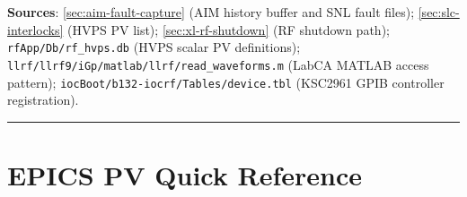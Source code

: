 \begin{keynote}
\textbf{Sources}: \cref{sec:aim-fault-capture} (AIM history buffer and SNL fault files); \cref{sec:slc-interlocks} (HVPS PV list); \cref{sec:xl-rf-shutdown} (RF shutdown path); \texttt{rfApp/\allowbreak{}Db/\allowbreak{}rf\_\allowbreak{}hvps.\allowbreak{}db} (HVPS scalar PV definitions); \texttt{llrf/\allowbreak{}llrf9/\allowbreak{}iGp/\allowbreak{}matlab/\allowbreak{}llrf/\allowbreak{}read\_\allowbreak{}waveforms.\allowbreak{}m} (LabCA MATLAB access pattern); \texttt{iocBoot/\allowbreak{}b132-\allowbreak{}iocrf/\allowbreak{}Tables/\allowbreak{}device.\allowbreak{}tbl} (KSC2961 GPIB controller registration).
\end{keynote}

\begin{center}\rule{0.5\linewidth}{0.5pt}\end{center}

\appendix

\section{EPICS PV Quick Reference}\label{sec:pvref}


